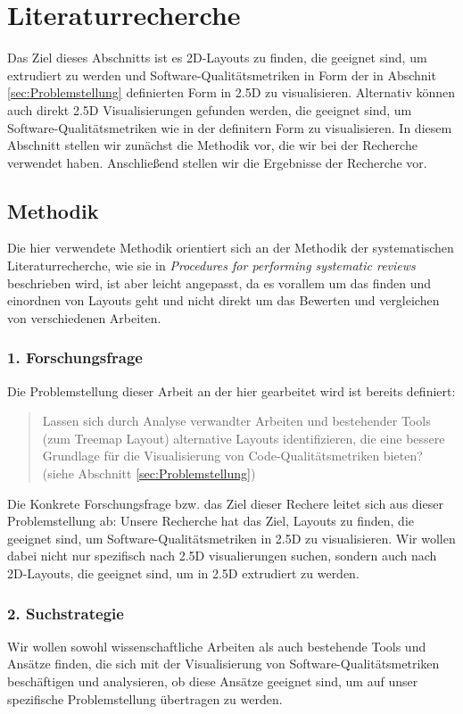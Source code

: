 \chapter{Literaturrecherche} \label{sec:LiteraturRecherche}
Das Ziel dieses Abschnitts ist es 2D-Layouts zu finden, die geeignet sind, um extrudiert zu werden und Software-Qualitätsmetriken in Form der in Abschnit \ref{sec:Problemstellung} definierten Form in 2.5D zu visualisieren. Alternativ können auch direkt 2.5D Visualisierungen gefunden werden, die geeignet sind, um Software-Qualitätsmetriken wie in der definitern Form zu visualisieren. 
In diesem Abschnitt stellen wir zunächst die Methodik vor, die wir bei der Recherche verwendet haben. Anschließend stellen wir die Ergebnisse der Recherche vor. 

\section{Methodik} \label{sec:Methodik}
Die hier verwendete Methodik orientiert sich an der Methodik der systematischen Literaturrecherche, wie sie in \textit{Procedures for performing systematic reviews}\cite{kitchenham2004procedures} beschrieben wird, ist aber leicht angepasst, da es vorallem um das finden und einordnen von Layouts geht und nicht direkt um das Bewerten und vergleichen von verschiedenen Arbeiten.

\subsection*{1. Forschungsfrage} \label{sec:Forschungsfrage}
Die Problemstellung dieser Arbeit an der hier gearbeitet wird ist bereits definiert:
\begin{quote}
    Lassen sich durch Analyse verwandter Arbeiten und bestehender Tools (zum Treemap Layout) alternative Layouts identifizieren, die eine bessere Grundlage für die Visualisierung von Code-Qualitätsmetriken bieten? (siehe Abschnitt \ref{sec:Problemstellung})
\end{quote}

Die Konkrete Forschungsfrage bzw. das Ziel dieser Rechere leitet sich aus dieser Problemstellung ab:
Unsere Recherche hat das Ziel, Layouts zu finden, die geeignet sind, um Software-Qualitätsmetriken in 2.5D zu visualisieren. Wir wollen dabei nicht nur spezifisch nach 2.5D visualierungen suchen, sondern auch nach 2D-Layouts, die geeignet sind, um in 2.5D extrudiert zu werden.

\subsection*{2. Suchstrategie} \label{sec:Suchstrategie}
Wir wollen sowohl wissenschaftliche Arbeiten als auch bestehende Tools und Ansätze finden, die sich mit der Visualisierung von Software-Qualitätsmetriken beschäftigen und analysieren, ob diese Ansätze geeignet sind, um auf unser spezifische Problemstellung übertragen zu werden.

